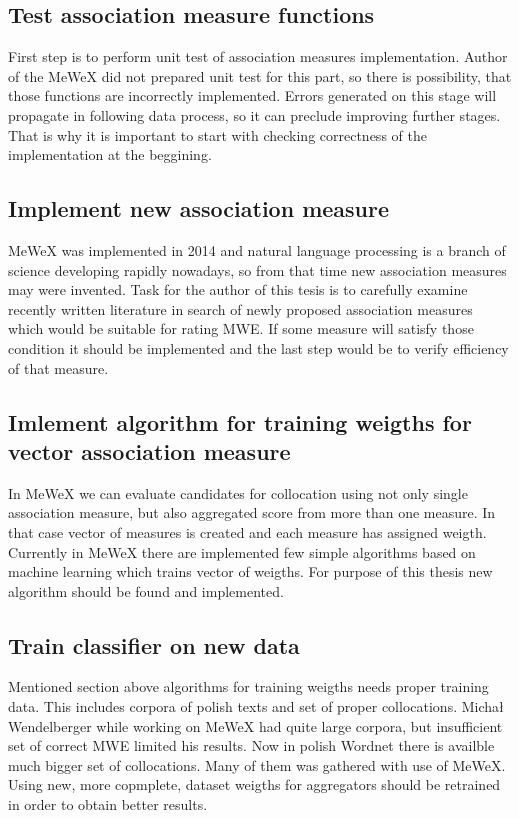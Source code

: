 \subsection{Test association measure functions}
First step is to perform unit test of association measures implementation. Author of the MeWeX did not prepared unit test for this part, 
so there is possibility, that those functions are incorrectly implemented. Errors generated on this stage will propagate in following data process, 
so it can preclude improving further stages. That is why it is important to start with checking correctness of the implementation 
at the beggining.

\subsection{Implement new association measure}
MeWeX was implemented in 2014 and natural language processing is a branch of science developing rapidly nowadays, 
so from that time new association measures may were invented. Task for the author of this tesis is to carefully examine recently written literature 
in search of newly proposed association measures which would be suitable for rating MWE. If some measure will satisfy those condition it should 
be implemented and the last step would be to verify efficiency of that measure.

\subsection{Imlement algorithm for training weigths for vector association measure}
In MeWeX we can evaluate candidates for collocation using not only single association measure, but also aggregated score from more than one measure. 
In that case vector of measures is created and each measure has assigned weigth. Currently in MeWeX there are implemented few simple algorithms 
based on machine learning which trains vector of weigths. For purpose of this thesis new algorithm should be found and implemented.

\subsection{Train classifier on new data}
Mentioned section above algorithms for training weigths needs proper training data. This includes corpora of polish texts and set 
of proper collocations. Michał Wendelberger while working on MeWeX had quite large corpora, but insufficient set of correct MWE limited his results. 
Now in polish Wordnet there is availble much bigger set of collocations. Many of them was gathered with use of MeWeX.
Using new, more copmplete, dataset weigths for aggregators should be retrained in order to obtain better results.

